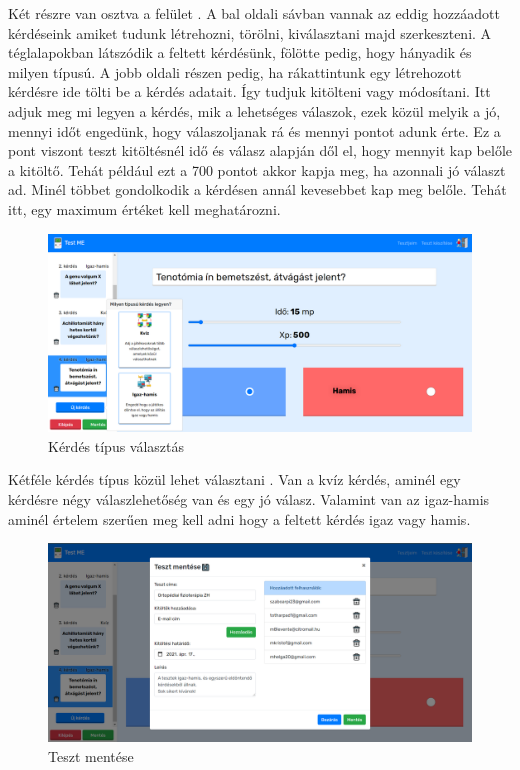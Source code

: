 Két részre van osztva a felület . A bal oldali sávban vannak az eddig hozzáadott kérdéseink amiket tudunk létrehozni, törölni, kiválasztani majd szerkeszteni. A téglalapokban látszódik a feltett kérdésünk, fölötte pedig, hogy hányadik és milyen típusú. A jobb oldali részen pedig, ha rákattintunk egy létrehozott kérdésre ide tölti be a kérdés adatait. Így tudjuk kitölteni vagy módosítani. Itt adjuk meg mi legyen a kérdés, mik a lehetséges válaszok, ezek közül melyik a jó, mennyi időt engedünk, hogy válaszoljanak rá és mennyi pontot adunk érte. Ez a pont viszont teszt kitöltésnél idő és válasz alapján dől el, hogy mennyit kap belőle a kitöltő. Tehát például ezt a 700 pontot akkor kapja meg, ha azonnali jó választ ad. Minél többet gondolkodik a kérdésen annál kevesebbet kap meg belőle. Tehát itt, egy maximum értéket kell meghatározni.

\begin{figure}[H]
    \centering
    \includegraphics[width=\linewidth]{images/make_test2.png}
    \caption{Kérdés típus választás}
    \label{fig:make_test2}
\end{figure}

Kétféle kérdés típus közül lehet választani . Van a kvíz kérdés, aminél egy kérdésre négy válaszlehetőség van és egy jó válasz. Valamint van az igaz-hamis aminél értelem szerűen meg kell adni hogy a feltett kérdés igaz vagy hamis.


\begin{figure}[H]
    \centering
    \includegraphics[width=\linewidth]{images/make_test3.png}
    \caption{Teszt mentése}
    \label{fig:make_test3}
\end{figure}

